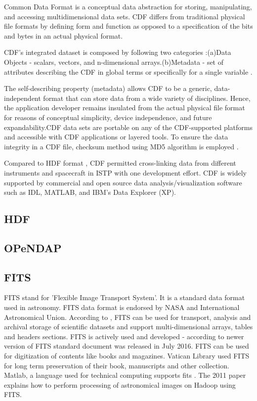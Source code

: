      Common Data Format \cite{www-cdf} is a conceptual data
     abstraction for storing, manipulating, and accessing
     multidimensional data sets. CDF differs from traditional physical
     file formats by defining form and function as opposed to a
     specification of the bits and bytes in an actual physical format.
 
     CDF's integrated dataset is composed by following two categories
     :(a)Data Objects - scalars, vectors, and n-dimensional
     arrays.(b)Metadata - set of attributes describing the CDF in
     global terms or specifically for a single variable
     \cite{user-guide-cdf}.

     The self-describing property (metadata) allows CDF to be a
     generic, data-independent format that can store data from a wide
     variety of disciplines. Hence, the application developer remains
     insulated from the actual physical file format for reasons of
     conceptual simplicity, device independence, and future
     expandability.CDF data sets are portable on any of the
     CDF-supported platforms and accessible with CDF applications or
     layered tools. To ensure the data integrity in a CDF file,
     checksum method using MD5 algorithm is employed
     \cite{www-digitalpreserve}.

     Compared to HDF format \cite{www-wiki-hdf}, CDF permitted
     cross-linking data from different instruments and spacecraft in
     ISTP with one development effort. CDF is widely supported by
     commercial and open source data analysis/visualization software
     such as IDL, MATLAB, and IBM’s Data Explorer (XP).

\subsection{ HDF}
\subsection{ OPeNDAP}
\subsection{ FITS}

     FITS stand for 'Flexible Image Transport System'. It is a
     standard data format used in astronomy. FITS data format is
     endorsed by NASA and International Astronomical Union. According
     to \cite{www-fits-nasa}, FITS can be used for transport,
     analysis and archival storage of scientific datasets and support
     multi-dimensional arrays, tables and headers sections.  FITS is
     actively used and developed - according to
     \cite{www-news-fits-2016} newer version of FITS standard
     document was released in July 2016. FITS can be used for
     digitization of contents like books and
     magazines. Vatican Library \cite{www-fits-vatican-library} used FITS 
     for long term preservation of their book, manuscripts and other
     collection. Matlab, a language used for technical computing
     supports fits \cite{www-fits-matlab}. The 2011 paper
     \cite{paper-fits-2011} explains how to perform
     processing of astronomical images on Hadoop using FITS. 

